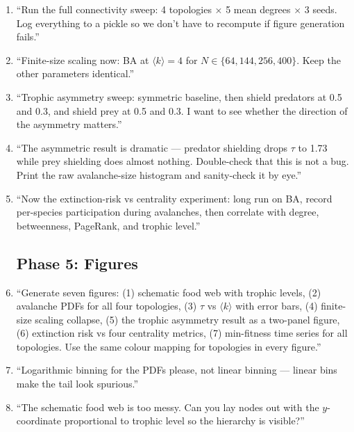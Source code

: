 \documentclass[10pt,a4paper,twocolumn]{article}
\begin{document}
\begin{enumerate}
\subsection*{Phase 4: Experiments}
\item ``Run the full connectivity sweep: 4 topologies $\times$ 5 mean degrees $\times$ 3 seeds. Log everything to a pickle so we don't have to recompute if figure generation fails.''
\item ``Finite-size scaling now: BA at $\langle k \rangle = 4$ for $N \in \{64, 144, 256, 400\}$. Keep the other parameters identical.''
\item ``Trophic asymmetry sweep: symmetric baseline, then shield predators at 0.5 and 0.3, and shield prey at 0.5 and 0.3. I want to see whether the direction of the asymmetry matters.''
\item ``The asymmetric result is dramatic --- predator shielding drops $\tau$ to 1.73 while prey shielding does almost nothing. Double-check that this is not a bug. Print the raw avalanche-size histogram and sanity-check it by eye.''
\item ``Now the extinction-risk vs centrality experiment: long run on BA, record per-species participation during avalanches, then correlate with degree, betweenness, PageRank, and trophic level.''

\subsection*{Phase 5: Figures}
\item ``Generate seven figures: (1) schematic food web with trophic levels, (2) avalanche PDFs for all four topologies, (3) $\tau$ vs $\langle k \rangle$ with error bars, (4) finite-size scaling collapse, (5) the trophic asymmetry result as a two-panel figure, (6) extinction risk vs four centrality metrics, (7) min-fitness time series for all topologies. Use the same colour mapping for topologies in every figure.''
\item ``Logarithmic binning for the PDFs please, not linear binning --- linear bins make the tail look spurious.''
\item ``The schematic food web is too messy. Can you lay nodes out with the $y$-coordinate proportional to trophic level so the hierarchy is visible?''


\end{enumerate}
\end{document}

